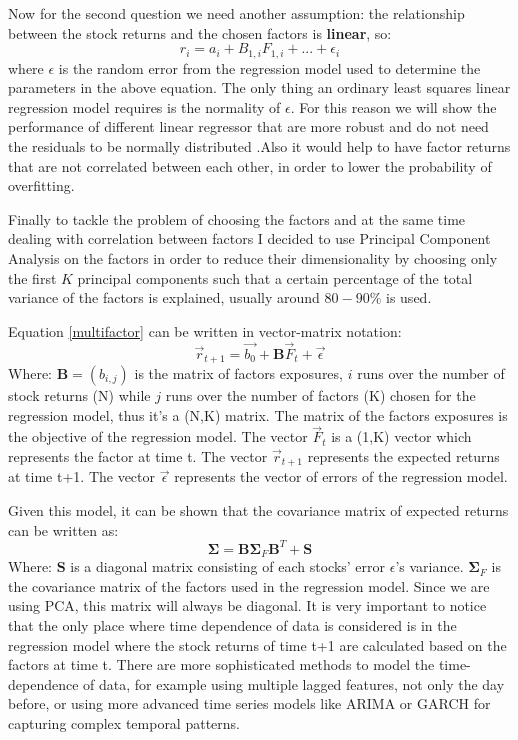 Now for the second question we need another assumption: the relationship between the stock returns and the chosen factors is \textbf{linear}, so:
\begin{equation}
    r_i = a_i + B_{1,i}F_{1,i} + ... + \epsilon_i
    \label{multifactor}
\end{equation}
where $\epsilon$ is the random error from the regression model used to determine the parameters in the above equation. The only thing an ordinary least squares linear regression model requires is the normality of $\epsilon$. For this reason we will show the performance of different linear regressor that are more robust and do not need the residuals to be normally distributed .Also it would help to have factor returns that are not correlated between each other, in order to lower the probability of overfitting.

Finally to tackle the problem of choosing the factors and at the same time dealing with correlation between factors I decided to use Principal Component Analysis on the factors in order to reduce their dimensionality by choosing only the first $K$ principal components such that a certain percentage of the total variance of the factors is explained, usually around $80-90\%$ is used.

Equation \eqref{multifactor} can be written in vector-matrix notation:
\begin{equation}
    \Vec{r}_{t+1} = \vec{b_0} + \mathbf{B}\vec{F}_{t} + \vec{\epsilon}
\end{equation}
Where: $\mathbf{B} = (b_{i,j})$ is the matrix of factors exposures, $i$ runs over the number of stock returns (N) while $j$ runs over the number of factors (K) chosen for the regression model, thus it's a (N,K) matrix. The matrix of the factors exposures is the objective of the regression model. The vector $\vec{F}_{t}$ is a (1,K) vector which represents the factor at time t. The vector $\vec{r}_{t+1}$ represents the expected returns at time t+1. The vector $\vec{\epsilon}$ represents the vector of errors of the regression model.

Given this model, it can be shown that the covariance matrix of expected returns can be written as:
\begin{equation}
    \mathbf{\Sigma} = \mathbf{B}\mathbf{\Sigma}_{F}\mathbf{B}^{T} + \mathbf{S}
    \label{cov-matrix-returns}
\end{equation}
Where: $\mathbf{S}$ is a diagonal matrix consisting of each stocks' error $\epsilon$'s variance. $\mathbf{\Sigma}_{F}$ is the covariance matrix of the factors used in the regression model. Since we are using PCA, this matrix will always be diagonal.
It is very important to notice that the only place where time dependence of data is considered is in the regression model where the stock returns of time t+1 are calculated based on the factors at time t. There are more sophisticated methods to model the time-dependence of data, for example using multiple lagged features, not only the day before, or using more advanced time series models like ARIMA or GARCH for capturing complex temporal patterns.


